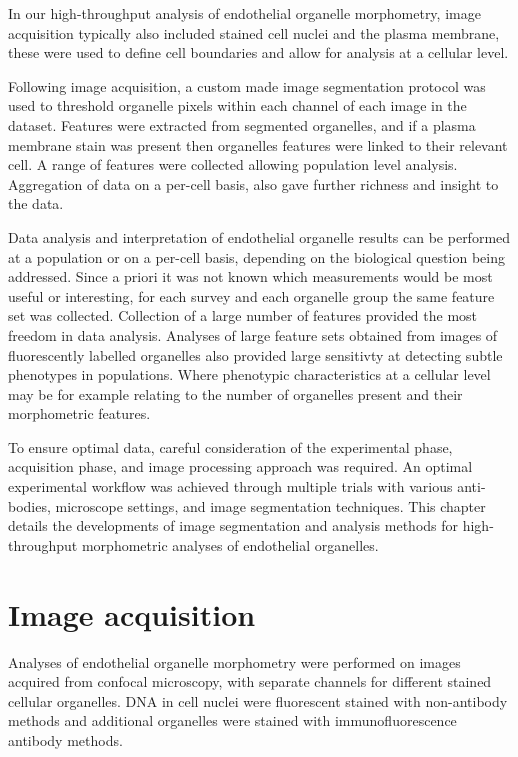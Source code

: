 In our high-throughput analysis of endothelial organelle morphometry, image acquisition typically also included stained cell nuclei and the plasma membrane, these were used to define cell boundaries and allow for analysis at a cellular level.

Following image acquisition, a custom made image segmentation protocol was used to threshold organelle pixels within each channel of each image in the dataset. Features were extracted from segmented organelles, and if a plasma membrane stain was present then organelles features were linked to their relevant cell. A range of features were collected allowing population level analysis. Aggregation of data on a per-cell basis, also gave further richness and insight to the data.

Data analysis and interpretation of endothelial organelle results can be performed at a population or on a per-cell basis, depending on the biological question being addressed. Since a priori it was not known which measurements would be most useful or interesting, for each survey and each organelle group the same feature set was collected. Collection of a large number of features provided the most freedom in data analysis. Analyses of large feature sets obtained from images of fluorescently labelled organelles also provided large sensitivty at detecting subtle phenotypes in populations. Where phenotypic characteristics at a cellular level may be for example relating to the number of organelles present and their morphometric features.

To ensure optimal data, careful consideration of the experimental phase, acquisition phase, and image processing approach was required. An optimal experimental workflow was achieved through multiple trials with various anti-bodies, microscope settings, and image segmentation techniques. This chapter details the developments of image segmentation and analysis methods for high-throughput morphometric analyses of endothelial organelles.

\section{Image acquisition}
\label{endothelial_morphometry:image_acquisition}
Analyses of endothelial organelle morphometry were performed on images acquired from confocal microscopy, with separate channels for different stained cellular organelles. DNA in cell nuclei were fluorescent stained with non-antibody methods and additional organelles were stained with immunofluorescence antibody methods.

